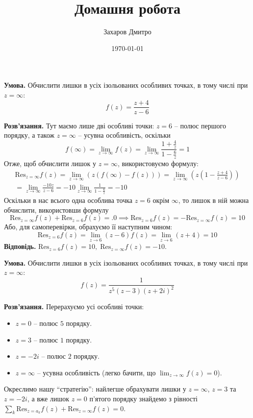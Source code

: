 \documentclass[oneside,solution]{karazin-complan-assign}
\title{Домашня робота}
\author{Захаров Дмитро}
\date{\today}
\begin{document}
\maketitle


\problem{}

\textbf{Умова.} Обчислити лишки в усіх ізольованих особливих точках, в тому числі при $z=\infty$:
\begin{equation*}
    f(z) = \frac{z+4}{z-6}
\end{equation*}

\textbf{Розв'язання.} Тут маємо лише дві особливі точки: $z=6$ -- полюс першого порядку, а також $z=\infty$ -- усувна особливість, оскільки
\begin{equation}
    f(\infty)=\lim_{z \to \infty}f(z) = \lim_{z \to \infty} \frac{1+\frac{4}{z}}{1-\frac{6}{z}} = 1
\end{equation}
Отже, щоб обчислити лишок у $z=\infty$, використовуємо формулу:
\begin{gather}
    \text{Res}_{z=\infty}f(z) = \lim_{z \to \infty}\left(z(f(\infty)-f(z))\right) = \lim_{z \to \infty}\left(z\left(1-\frac{z+4}{z-6}\right)\right) \nonumber \\
    = \lim_{z \to \infty} \frac{-10z}{z-6} = -10\lim_{z \to \infty} \frac{1}{1-\frac{6}{z}} = -10
\end{gather}
Оскільки в нас всього одна особлива точка $z=6$ окрім $\infty$, то лишок в ній можна обчислити, використовши формулу
\begin{equation}
    \text{Res}_{z=\infty}f(z) + \text{Res}_{z=6}f(z) =.0 \implies \text{Res}_{z=6}f(z) = -\text{Res}_{z=\infty}f(z) = 10
\end{equation}
Або, для самоперевірки, обрахуємо її наступним чином:
\begin{equation}
    \text{Res}_{z=6}f(z) = \lim_{z \to 6}(z-6)f(z)=\lim_{z \to 6}(z+4) = 10
\end{equation}
\textbf{Відповідь.} $\text{Res}_{z=6}f(z)=10,\;\text{Res}_{z=\infty}f(z)=-10$.
\pagebreak

\problem{}

\textbf{Умова.} Обчислити лишки в усіх ізольованих особливих точках, в тому числі при $z=\infty$:
\begin{equation*}
    f(z) = \frac{1}{z^5(z-3)(z+2i)^2}
\end{equation*}

\textbf{Розв'язання.} Перерахуємо усі особливі точки:
\begin{itemize}
    \item $z=0$ -- полюс $5$ порядку.
    \item $z=3$ -- полюс $1$ порядку.
    \item $z=-2i$ -- полюс $2$ порядку.
    \item $z=\infty$ -- усувна особливість (легко бачити, що $\lim_{z \to \infty}f(z)=0$).
\end{itemize}
Окреслимо нашу ``стратегію'': найлегше обрахувати лишки у $z=\infty$, $z=3$ та $z=-2i$, а вже лишок $z=0$ п'ятого порядку знайдемо з рівності $\sum_{k}\text{Res}_{z=a_k}f(z)+\text{Res}_{z=\infty}f(z)=0$.
\end{document}
